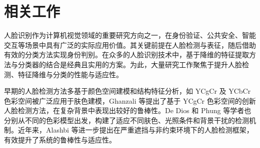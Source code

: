\documentclass[a4paper, utf8]{ctexart}
\begin{document}
	\section{相关工作}
	
	人脸识别作为计算机视觉领域的重要研究方向之一，在身份验证、公共安全、智能交互等场景中具有广泛的实际应用价值。其关键前提在人脸检测与表征，随后借助有效的分类方法实现身份判别。在众多的人脸识别技术中，基于降维的特征提取方法与分类器的结合是经典且实用的方案。为此，大量研究工作聚焦于提升人脸检测、特征降维与分类的性能与适应性。
	
	早期的人脸检测方法多基于颜色空间建模和结构特征分析，如 YCgCr 及 YCbCr 色彩空间被广泛应用于肤色建模，Ghanzali 等提出了基于 YCgCr 色彩空间的创新人脸检测方法，在复杂背景中表现出较好的鲁棒性\cite{chfd2}。De Dios 和 Phung 等学者也分别从不同的色彩模型出发，构建了适应不同肤色、光照条件和背景干扰的检测机制\cite{chfd1, chfd3}。近年来，Alashbi 等进一步提出在严重遮挡与非约束环境下的人脸检测框架，有效提升了系统的鲁棒性与适应性\cite{mhfd1}。
	
\end{document}
